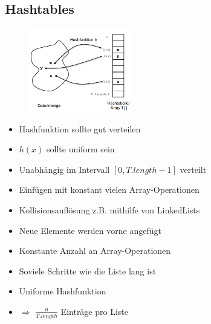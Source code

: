 \documentclass[
    ngerman,
    color=3b,
    load_common, %
    summary,
    boxarc,
]{tuda_summary}
\begin{document}
\subsection{Hashtables}\label{Hashtables}
\mbox{}\vspace{-2em}
\begin{figure}
    \includegraphics[width=0.4\textwidth]{pictures/hashtableIdee.PNG}
\end{figure}
\begin{idea}[Hashtable]\mbox{}
    \begin{itemize}
        \item Hashfunktion sollte gut verteilen
        \item $h(x)$ sollte uniform sein
        \item Unabhängig im Intervall $[0, T.length-1]$ verteilt
        \item Einfügen mit konstant vielen Array-Operationen
        \item Kollisionsauflösung z.B. mithilfe von LinkedLists
        \item Neue Elemente werden vorne angefügt
        \item Konstante Anzahl an Array-Operationen
        \item Soviele Schritte wie die Liste lang ist
        \item Uniforme Hashfunktion
        \item[] $\Rightarrow$ $\frac{n}{T.length}$ Einträge pro Liste
    \end{itemize}
\end{idea}
\end{document}
